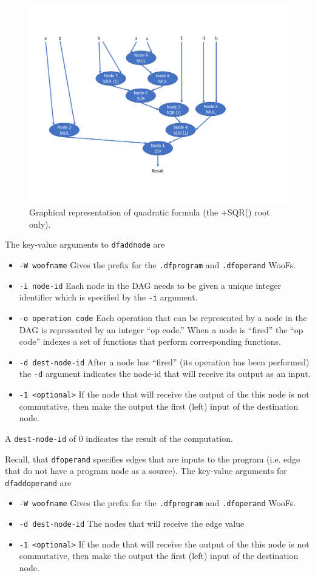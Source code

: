 \documentclass[10pt]{article}
\begin{document}
\begin{figure}[t]
\centering
\includegraphics[scale=0.5]{quad.pdf}
\caption{Graphical representation of quadratic formula (the +SQR() root only).\label{fig:quad}}
\end{figure}

The key-value arguments to \verb+dfaddnode+ are
\begin{itemize}
\item \verb+-W woofname+ Gives the prefix for the \verb+.dfprogram+ and
\verb+.dfoperand+ WooFs.
\item \verb+-i node-id+ Each node in the DAG needs to be given a unique
integer identifier which is specified by the \verb+-i+ argument.
\item \verb+-o operation code+ Each operation that can be represented
by a node in the DAG is represented by an integer ``op code.''  When a node is
``fired'' the ``op code'' indexes a set of functions that perform
corresponding functions.    
\item \verb+-d dest-node-id+ After a node has ``fired'' (its operation
has been performed) the \verb+-d+ argument indicates the node-id that will
receive its output as an input.
\item \verb+-1 <optional>+ If the node that will receive the output of the
this node is not commutative, then make the output the first (left) input of
the destination node.
\end{itemize}
A \verb+dest-node-id+ of $0$ indicates the result of the computation.  

Recall, that \verb+dfoperand+ specifies edges that are inputs to the program
(i.e. edge that do not have a program node as a source). 
The key-value arguments for \verb+dfaddoperand+ are
\begin{itemize}
\item \verb+-W woofname+ Gives the prefix for the \verb+.dfprogram+ and 
\verb+.dfoperand+ WooFs.
\item \verb+-d dest-node-id+ The nodes that will receive the edge value
\item \verb+-1 <optional>+ If the node that will receive the output of the 
this node is not commutative, then make the output the first (left) input of 
the destination node.
\end{itemize}
\end{document}
